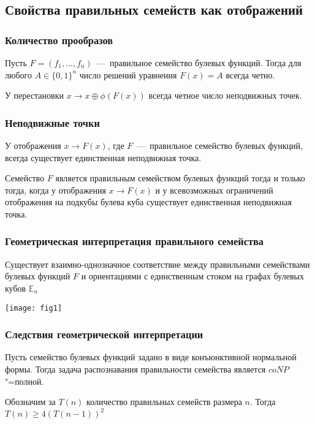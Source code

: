 \subsection{Свойства правильных семейств как отображений}

\begin{frame}
    \frametitle{Количество прообразов}
    \begin{thm}
        Пусть $F = (f_1, \ldots, f_n)$~---~правильное семейство булевых функций.
        Тогда для любого $A \in \{0, 1\}^n$ число решений уравнения
        \(
            F(x) = A
        \)
        всегда четно.
    \end{thm}
    \pause
    \begin{cor}
        У перестановки $x \to x \oplus \phi(F(x))$ всегда четное число неподвижных точек.
    \end{cor}
\end{frame}


\begin{frame}
    \frametitle{Неподвижные точки}
    \begin{thm}
        У отображения $x \to F(x)$, где $F$~---~правильное семейство булевых функций, всегда существует единственная неподвижная точка.
    \end{thm}
    \pause
    \begin{thm}
        Семейство $F$ является правильным семейством булевых функций тогда и только тогда, когда у отображения $x \to F(x)$ и у всевозможных ограничений отображения на подкубы булева куба существует единственная неподвижная точка.
    \end{thm}
\end{frame}


\begin{frame}
    \frametitle{Геометрическая интерпретация правильного семейства}
    \begin{thm}
        Существует взаимно-однозначное соответствие между правильными семействами булевых функций $F$ и ориентациями с единственным стоком на графах булевых кубов $\mathbb{E}_n$
    \end{thm}

    \centering
    \texttt{[image: fig1]}
\end{frame}


\begin{frame}
    \frametitle{Следствия геометрической интерпретации}
    \begin{cor}
        Пусть семейство булевых функций задано в виде конъюнктивной нормальной формы.
        Тогда задача распознавания правильности семейства является $coNP$"=полной.
    \end{cor}
    \pause
    \begin{cor}
        Обозначим за $T(n)$ количество правильных семейств размера $n.$ 
        Тогда $T(n) \ge 4 (T(n-1))^2 $ 
    \end{cor}
\end{frame}


